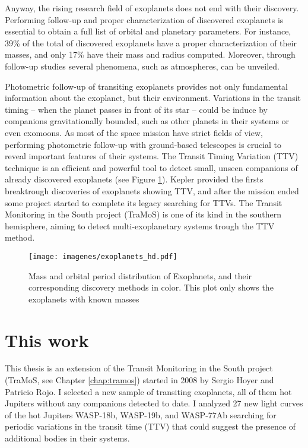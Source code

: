 Anyway, the rising research field of exoplanets does not end with their discovery. Performing follow-up and proper characterization of discovered exoplanets is essential to obtain a full list of orbital and planetary parameters. For instance,  39\%  of the total of discovered exoplanets have a proper characterization of their masses, and only 17\% have their mass and radius computed. Moreover, through follow-up studies several phenomena, such as atmospheres, can be unveiled. 

Photometric follow-up of transiting exoplanets provides not only fundamental information about the exoplanet, but their environment. Variations in the transit timing -- when the planet passes in front of its star -- could be induce by companions gravitationally bounded, such as other planets in their systems or even exomoons. As most of the space mission have strict fields of view, performing photometric follow-up with ground-based telescopes is crucial to reveal important features of their systems. The Transit Timing Variation (TTV) technique is an efficient and powerful tool to detect small, unseen companions of already discovered exoplanets (see Figure \ref{exoplanets}). Kepler provided the firsts breaktrough discoveries of exoplanets showing TTV, and after the mission ended some project started to complete its legacy searching for TTVs. The Transit Monitoring in the South project (TraMoS) is one of its kind in the southern hemisphere, aiming to detect multi-exoplanetary systems trough the TTV method.  

\begin{figure}[t]
\centering
\texttt{[image: imagenes/exoplanets\_hd.pdf]}
\caption{Mass and orbital period distribution of Exoplanets, and their corresponding discovery methods in color. This plot only shows the exoplanets with known masses}
\label{exoplanets}
\end{figure}

\section{This work}

This thesis is an extension of the Transit Monitoring in the South project (TraMoS, see Chapter \ref{chap:tramos}) started in 2008 by Sergio Hoyer and Patricio Rojo. I selected a new sample of transiting exoplanets, all of them hot Jupiters without any companions detected to date. I analyzed 27 new light curves of the hot Jupiters WASP-18b, WASP-19b, and WASP-77Ab searching for periodic variations in the transit time (TTV) that could suggest the presence of additional bodies in their systems. 

